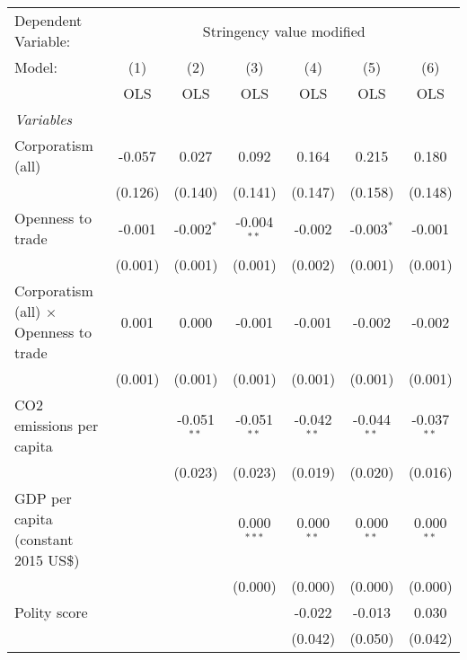 
\begingroup
\centering
\begin{tabular}{lcccccc}
   \toprule
   Dependent Variable: & \multicolumn{6}{c}{Stringency value modified}\\
   Model:                                        & (1)     & (2)           & (3)           & (4)           & (5)           & (6)\\  
                                                 &  OLS    & OLS           & OLS           & OLS           & OLS           & OLS\\  
   \midrule
   \emph{Variables}\\
   Corporatism (all)                             & -0.057  & 0.027         & 0.092         & 0.164         & 0.215         & 0.180\\   
                                                 & (0.126) & (0.140)       & (0.141)       & (0.147)       & (0.158)       & (0.148)\\   
   Openness to trade                             & -0.001  & -0.002$^{*}$  & -0.004$^{**}$ & -0.002        & -0.003$^{*}$  & -0.001\\   
                                                 & (0.001) & (0.001)       & (0.001)       & (0.002)       & (0.001)       & (0.001)\\   
   Corporatism (all) $\times$ Openness to trade  & 0.001   & 0.000         & -0.001        & -0.001        & -0.002        & -0.002\\   
                                                 & (0.001) & (0.001)       & (0.001)       & (0.001)       & (0.001)       & (0.001)\\   
   CO2 emissions per capita                      &         & -0.051$^{**}$ & -0.051$^{**}$ & -0.042$^{**}$ & -0.044$^{**}$ & -0.037$^{**}$\\   
                                                 &         & (0.023)       & (0.023)       & (0.019)       & (0.020)       & (0.016)\\   
   GDP per capita (constant 2015 US\$)           &         &               & 0.000$^{***}$ & 0.000$^{**}$  & 0.000$^{**}$  & 0.000$^{**}$\\   
                                                 &         &               & (0.000)       & (0.000)       & (0.000)       & (0.000)\\   
   Polity score                                  &         &               &               & -0.022        & -0.013        & 0.030\\   
                                                 &         &               &               & (0.042)       & (0.050)       & (0.042)\\   

\end{tabular}
